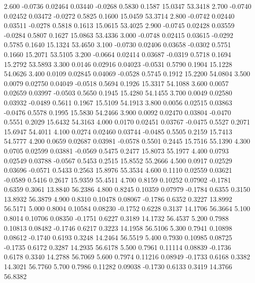    2.600  -0.0736   0.02464   0.03440  -0.0268   0.5830   0.1587  15.0347  53.3418
   2.700  -0.0740   0.02452   0.03472  -0.0272   0.5825   0.1600  15.0459  53.3714
   2.800  -0.0742   0.02440   0.03511  -0.0278   0.5818   0.1613  15.0615  53.4025
   2.900  -0.0745   0.02428   0.03559  -0.0284   0.5807   0.1627  15.0863  53.4336
   3.000  -0.0748   0.02415   0.03615  -0.0292   0.5785   0.1640  15.1324  53.4650
   3.100  -0.0730   0.02406   0.03658  -0.0302   0.5751   0.1660  15.2071  53.5105
   3.200  -0.0664   0.02414   0.03687  -0.0319   0.5718   0.1694  15.2792  53.5893
   3.300   0.0146   0.02916   0.04023  -0.0531   0.5790   0.1904  15.1228  54.0626
   3.400   0.0109   0.02845   0.04069  -0.0528   0.5745   0.1912  15.2200  54.0804
   3.500   0.0079   0.02750   0.04049  -0.0518   0.5694   0.1926  15.3317  54.1088
   3.600   0.0057   0.02659   0.03997  -0.0503   0.5650   0.1945  15.4280  54.1455
   3.700   0.0049   0.02580   0.03932  -0.0489   0.5611   0.1967  15.5109  54.1913
   3.800   0.0056   0.02515   0.03863  -0.0476   0.5578   0.1995  15.5830  54.2466
   3.900   0.0092   0.02470   0.03804  -0.0470   0.5551   0.2029  15.6432  54.3163
   4.000   0.0170   0.02451   0.03767  -0.0475   0.5527   0.2071  15.6947  54.4011
   4.100   0.0274   0.02460   0.03744  -0.0485   0.5505   0.2159  15.7413  54.5777
   4.200   0.0659   0.02687   0.03981  -0.0578   0.5501   0.2445  15.7516  55.1390
   4.300   0.0705   0.02599   0.03881  -0.0569   0.5475   0.2477  15.8073  55.1977
   4.400   0.0793   0.02549   0.03788  -0.0567   0.5453   0.2515  15.8552  55.2666
   4.500   0.0917   0.02529   0.03696  -0.0571   0.5433   0.2563  15.8976  55.3534
   4.600   0.1110   0.02559   0.03621  -0.0589   0.5416   0.2617  15.9359  55.4511
   4.700   0.8159   0.10252   0.07902  -0.1781   0.6359   0.3061  13.8840  56.2386
   4.800   0.8245   0.10359   0.07979  -0.1784   0.6355   0.3150  13.8932  56.3879
   4.900   0.8310   0.10478   0.08067  -0.1786   0.6352   0.3227  13.8992  56.5171
   5.000   0.8004   0.10584   0.08230  -0.1752   0.6228   0.3137  14.1706  56.3664
   5.100   0.8014   0.10706   0.08350  -0.1751   0.6227   0.3189  14.1732  56.4537
   5.200   0.7988   0.10813   0.08482  -0.1746   0.6217   0.3223  14.1958  56.5106
   5.300   0.7941   0.10898   0.08612  -0.1740   0.6193   0.3248  14.2464  56.5519
   5.400   0.7930   0.10985   0.08725  -0.1735   0.6172   0.3287  14.2935  56.6178
   5.500   0.7961   0.11114   0.08839  -0.1736   0.6178   0.3340  14.2788  56.7069
   5.600   0.7974   0.11216   0.08949  -0.1733   0.6168   0.3382  14.3021  56.7760
   5.700   0.7986   0.11282   0.09038  -0.1730   0.6133   0.3419  14.3766  56.8382
